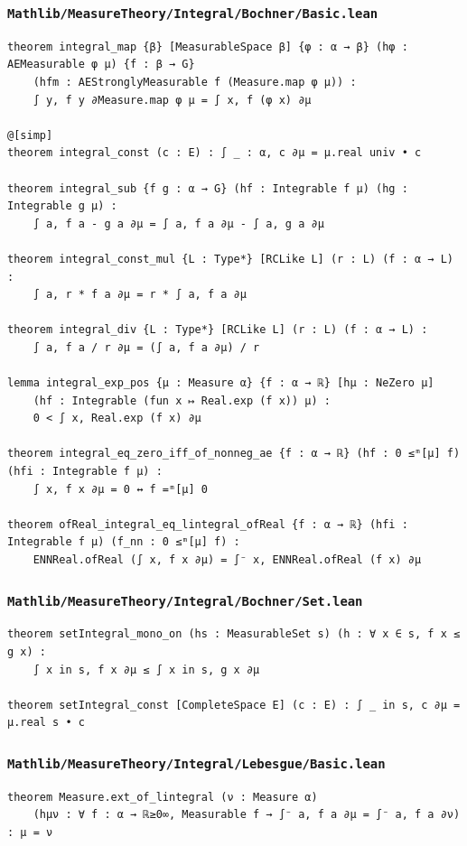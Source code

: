 \subsubsection{\texttt{Mathlib/MeasureTheory/Integral/Bochner/Basic.lean}}
\begin{lstlisting}[language=lean]
theorem integral_map {β} [MeasurableSpace β] {φ : α → β} (hφ : AEMeasurable φ μ) {f : β → G}
    (hfm : AEStronglyMeasurable f (Measure.map φ μ)) :
    ∫ y, f y ∂Measure.map φ μ = ∫ x, f (φ x) ∂μ

@[simp]
theorem integral_const (c : E) : ∫ _ : α, c ∂μ = μ.real univ • c

theorem integral_sub {f g : α → G} (hf : Integrable f μ) (hg : Integrable g μ) :
    ∫ a, f a - g a ∂μ = ∫ a, f a ∂μ - ∫ a, g a ∂μ

theorem integral_const_mul {L : Type*} [RCLike L] (r : L) (f : α → L) :
    ∫ a, r * f a ∂μ = r * ∫ a, f a ∂μ

theorem integral_div {L : Type*} [RCLike L] (r : L) (f : α → L) :
    ∫ a, f a / r ∂μ = (∫ a, f a ∂μ) / r

lemma integral_exp_pos {μ : Measure α} {f : α → ℝ} [hμ : NeZero μ]
    (hf : Integrable (fun x ↦ Real.exp (f x)) μ) :
    0 < ∫ x, Real.exp (f x) ∂μ

theorem integral_eq_zero_iff_of_nonneg_ae {f : α → ℝ} (hf : 0 ≤ᵐ[μ] f) (hfi : Integrable f μ) :
    ∫ x, f x ∂μ = 0 ↔ f =ᵐ[μ] 0

theorem ofReal_integral_eq_lintegral_ofReal {f : α → ℝ} (hfi : Integrable f μ) (f_nn : 0 ≤ᵐ[μ] f) :
    ENNReal.ofReal (∫ x, f x ∂μ) = ∫⁻ x, ENNReal.ofReal (f x) ∂μ
\end{lstlisting}

\subsubsection{\texttt{Mathlib/MeasureTheory/Integral/Bochner/Set.lean}}
\begin{lstlisting}[language=lean]
theorem setIntegral_mono_on (hs : MeasurableSet s) (h : ∀ x ∈ s, f x ≤ g x) :
    ∫ x in s, f x ∂μ ≤ ∫ x in s, g x ∂μ

theorem setIntegral_const [CompleteSpace E] (c : E) : ∫ _ in s, c ∂μ = μ.real s • c
\end{lstlisting}

\newpage
\subsubsection{\texttt{Mathlib/MeasureTheory/Integral/Lebesgue/Basic.lean}}
\begin{lstlisting}[language=lean]
theorem Measure.ext_of_lintegral (ν : Measure α)
    (hμν : ∀ f : α → ℝ≥0∞, Measurable f → ∫⁻ a, f a ∂μ = ∫⁻ a, f a ∂ν) : μ = ν
\end{lstlisting}

